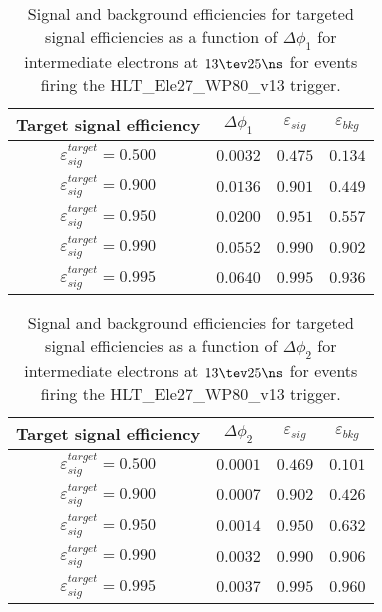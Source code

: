 \clearpage

\begin{table}[!bht]
  \begin{center}
    \begin{tabular}{cccc}
      \hline
      Target signal efficiency & $\Delta\phi_1$ & $\varepsilon_{sig}$ & $\varepsilon_{bkg}$ \\ 
      \hline
      $\varepsilon_{sig}^{target} = 0.500$ & $  0.0032$ & $0.475$ & $0.134$ \\
      $\varepsilon_{sig}^{target} = 0.900$ & $  0.0136$ & $0.901$ & $0.449$ \\
      $\varepsilon_{sig}^{target} = 0.950$ & $  0.0200$ & $0.951$ & $0.557$ \\
      $\varepsilon_{sig}^{target} = 0.990$ & $  0.0552$ & $0.990$ & $0.902$ \\
      $\varepsilon_{sig}^{target} = 0.995$ & $  0.0640$ & $0.995$ & $0.936$ \\
      \hline
    \end{tabular}
    \caption{Signal and background efficiencies for targeted signal efficiencies as a function of $\Delta\phi_1$ for intermediate electrons at $13\tev 25\ns$ for events firing the HLT\_Ele27\_WP80\_v13 trigger.}
    \label{tab:eff_rej_phi1_beam_13_25_trigger_27_I}
  \end{center}
\end{table}

\clearpage

\begin{table}[!bht]
  \begin{center}
    \begin{tabular}{cccc}
      \hline
      Target signal efficiency & $\Delta\phi_2$ & $\varepsilon_{sig}$ & $\varepsilon_{bkg}$ \\ 
      \hline
      $\varepsilon_{sig}^{target} = 0.500$ & $  0.0001$ & $0.469$ & $0.101$ \\
      $\varepsilon_{sig}^{target} = 0.900$ & $  0.0007$ & $0.902$ & $0.426$ \\
      $\varepsilon_{sig}^{target} = 0.950$ & $  0.0014$ & $0.950$ & $0.632$ \\
      $\varepsilon_{sig}^{target} = 0.990$ & $  0.0032$ & $0.990$ & $0.906$ \\
      $\varepsilon_{sig}^{target} = 0.995$ & $  0.0037$ & $0.995$ & $0.960$ \\
      \hline
    \end{tabular}
    \caption{Signal and background efficiencies for targeted signal efficiencies as a function of $\Delta\phi_2$ for intermediate electrons at $13\tev 25\ns$ for events firing the HLT\_Ele27\_WP80\_v13 trigger.}
    \label{tab:eff_rej_phi2_beam_13_25_trigger_27_I}
  \end{center}
\end{table}

